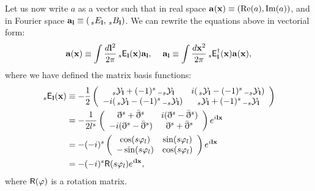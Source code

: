 \documentclass[a4paper,10pt]{article}
\begin{document}
    Let us now write $a$ as a vector such that in real space ${\bf a}({\bf x})\equiv({\rm Re}(a),{\rm Im}(a))$, and in Fourier space ${\bf a}_{\bf l}\equiv(\,_sE_{\bf l},\,_sB_{\bf l})$. We can rewrite the equations above in vectorial form:
    \begin{equation}
      {\bf a}({\bf x})\equiv\int\frac{d{\bf l}^2}{2\pi}\,_s{\sf E}_{\bf l}({\bf x}){\bf a}_{\bf l},\hspace{12pt}{\bf a}_{\bf l}\equiv\int\frac{d{\bf x}^2}{2\pi}\,_s{\sf E}^\dag_{\bf l}({\bf x}){\bf a}({\bf x}),
    \end{equation}
    where we have defined the matrix basis functions:
    \begin{align}
      \,_s{\sf E}_{\bf l}({\bf x})
      &\equiv-\frac{1}{2}
      \left(\begin{array}{cc}
                 \,_s{\cal Y}_{\bf l}+(-1)^s\,_{-s}{\cal Y}_{\bf l}  & i(\,_s{\cal Y}_{\bf l}-(-1)^s\,_{-s}{\cal Y}_{\bf l}) \\
              -i(\,_s{\cal Y}_{\bf l}-(-1)^s\,_{-s}{\cal Y}_{\bf l}) &   \,_s{\cal Y}_{\bf l}+(-1)^s\,_{-s}{\cal Y}_{\bf l}
            \end{array}\right)\\
      &=-\frac{1}{2l^s}
      \left(\begin{array}{cc}
                 \eth^s+\bar{\eth}^s & i(\eth^s-\bar{\eth}^s) \\
              -i(\eth^s-\bar{\eth}^s) &  \eth^s+\bar{\eth}^s
            \end{array}\right)e^{i{\bf l}{\bf x}}\\
      &=-(-i)^s
      \left(\begin{array}{cc}
                 \cos(s\varphi_l) & \sin(s\varphi_l) \\
                -\sin(s\varphi_l) & \cos(s\varphi_l)
            \end{array}\right)e^{i{\bf l}{\bf x}}\\
      &=-(-i)^s{\sf R}(s\varphi_l)e^{i{\bf l}{\bf x}},
    \end{align}
    where ${\sf R}(\varphi)$ is a rotation matrix.
    
\end{document}
